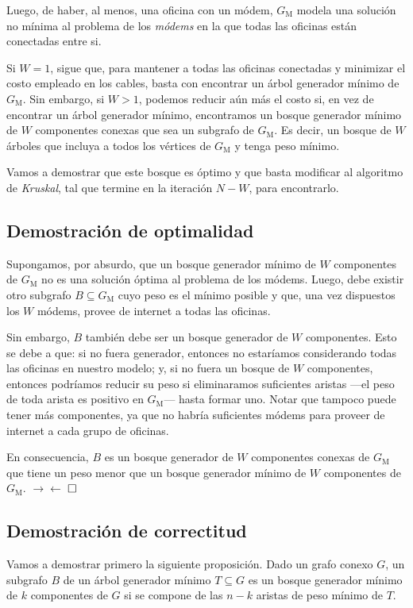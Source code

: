 Luego, de haber, al menos, una oficina con un módem, $G_{\text{M}}$ modela una solución no mínima al problema de los \textit{módems} en la que todas las oficinas están conectadas entre si. 

Si $W = 1$, sigue que, para mantener a todas las oficinas conectadas y minimizar el costo empleado en los cables, basta con encontrar un árbol generador mínimo de $G_{\text{M}}$. Sin embargo, si $W > 1$, podemos reducir aún más el costo si, en vez de encontrar un árbol generador mínimo, encontramos un bosque generador mínimo de $W$ componentes conexas que sea un subgrafo de $G_{\text{M}}$. Es decir, un bosque de $W$ árboles que incluya a todos los vértices de $G_{\text{M}}$ y tenga peso mínimo.

Vamos a demostrar que este bosque es óptimo y que basta modificar al algoritmo de \textit{Kruskal}, tal que termine en la iteración $N-W$, para encontrarlo.

\subsection{Demostración de optimalidad}

Supongamos, por absurdo, que un bosque generador mínimo de $W$ componentes de $G_{\text{M}}$ no es una solución óptima al problema de los módems. Luego, debe existir otro subgrafo $B \subseteq G_{\text{M}}$ cuyo peso es el mínimo posible y que, una vez dispuestos los $W$ módems, provee de internet a todas las oficinas. 

Sin embargo, $B$ también debe ser un bosque generador de $W$ componentes. Esto se debe a que: si no fuera generador, entonces no estaríamos considerando todas las oficinas en nuestro modelo; y, si no fuera un bosque de $W$ componentes, entonces podríamos reducir su peso si eliminaramos suficientes aristas ---el peso de toda arista es positivo en $G_{\text{M}}$--- hasta formar uno. Notar que tampoco puede tener más componentes, ya que no habría suficientes módems para proveer de internet a cada grupo de oficinas. 

En consecuencia, $B$ es un bosque generador de $W$ componentes conexas de $G_{\text{M}}$ que tiene un peso menor que un bosque generador mínimo de $W$ componentes  de $G_{\text{M}}$. $\rightarrow\leftarrow$ $\hfill \square$

\subsection{Demostración de correctitud}\label{correctitud} Vamos a demostrar primero la siguiente proposición. Dado un grafo conexo $G$, un subgrafo $B$ de un árbol generador mínimo $T \subseteq G$ es un bosque generador mínimo de $k$ componentes de $G$ si se compone de las $n - k$ aristas de peso mínimo de $T$.

